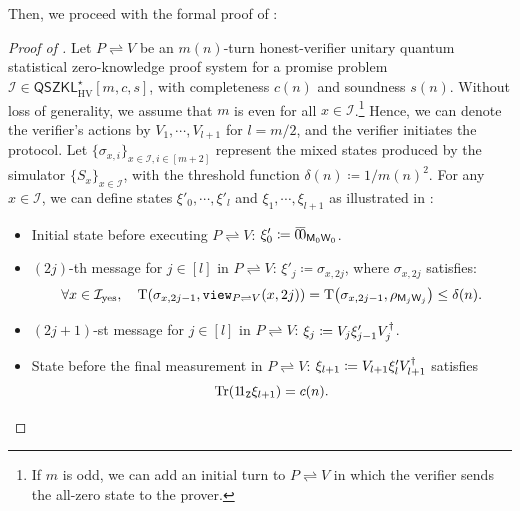 \documentclass[11pt, a4paper]{article}
\numberwithin{equation}{section}
\numberwithin{figure}{section}
\newcommand{\QSZKLstar}{\mathsf{QSZKL}^{\star}_{\mathrm{HV}}}
\newcommand{\view}[2]{\mathtt{view}_{{#1}\rightleftharpoons{#2}}}
\newcommand{\protocol}[2]{{#1}\!\rightleftharpoons\!{#2}}
\DeclarePairedDelimiter\rbra{\lparen}{\rparen}
\let\ket\relax\DeclarePairedDelimiter\ket{\lvert}{\rangle}
\let\bra\relax\DeclarePairedDelimiter\bra{\langle}{\rvert}
\newcommand{\ketbra}[2]{\ensuremath{\ket{#1}\!\bra{#2}}}
\newcommand{\Tr}{\mathrm{Tr}}
\newcommand{\td}{\mathrm{T}}
\newcommand{\yes}{{\rm yes}}
\newcommand{\calI}{\mathcal{I}}
\newcommand{\sfM}{\mathsf{M}}
\newcommand{\sfW}{\mathsf{W}}
\newcommand{\ttZ}{\mathtt{Z}}
\begin{document}
Then, we proceed with the formal proof of :
\begin{proof}[Proof of ]
    Let $\protocol{P}{V}$ be an $m(n)$-turn honest-verifier unitary quantum statistical zero-knowledge proof system for a promise problem $\calI \in\QSZKLstar[m,c,s]$, with completeness $c(n)$ and soundness $s(n)$. Without loss of generality, we assume that $m$ is even for all $x\in \calI$.\footnote{If $m$ is odd, we can add an initial turn to $\protocol{P}{V}$ in which the verifier sends the all-zero state to the prover.\label{footref:dummy-message}} Hence, we can denote the verifier's actions by $V_1,\cdots,V_{l+1}$ for $l=m/2$, and the verifier initiates the protocol. Let $\{\sigma_{x,i}\}_{x\in\calI,i\in[m+2]}$ represent the mixed states produced by the simulator $\{S_x\}_{x\in\calI}$, with the threshold function $\delta(n) \coloneqq 1/m(n)^2$. For any $x\in \calI$, we can define states $\xi'_0,\cdots,\xi'_l$ and $\xi_1,\cdots,\xi_{l+1}$ as illustrated in : 
    \begin{itemize}[itemsep=0.33em, topsep=0.33em, parsep=0.33em]
        \item Initial state before executing $\protocol{P}{V}$: $\xi'_0 \coloneqq \ketbra{\bar{0}}{\bar{0}}_{\sfM_0\sfW_0}$. 
        \item $(2j)$-th message for $j\in[l]$ in $\protocol{P}{V}$: $\xi'_j \coloneqq \sigma_{x,2j}$, where $\sigma_{x,2j}$ satisfies:
        \begin{equation}
            \label{eq:simulator-distance-bounds}
            \forall x\in \calI_\yes, \quad \td\rbra*{\sigma_{x,2j-1},\view{P}{V}(x,2j)} = \td\rbra*{\sigma_{x,2j-1},\rho_{\sfM_j\sfW_j}} \leq \delta(n).
        \end{equation}
        \item $(2j+1)$-st message for $j\in[l]$ in $\protocol{P}{V}$: $\xi_j \coloneqq V_j \xi'_{j-1} \smash{V_j^{\dagger}}$.
        \item State before the final measurement in $\protocol{P}{V}$: $\xi_{l+1} \coloneqq V_{l+1} \xi'_l \smash{V_{l+1}^{\dagger}}$ satisfies 
        \[\Tr\rbra*{\ketbra{1}{1}_{\ttZ} \xi_{l+1}}=c(n).\] 
    \end{itemize}


\end{proof}
\end{document}
